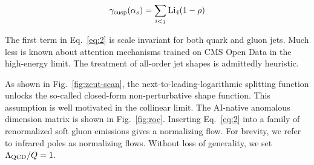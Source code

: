 \begin{equation}
  \gamma_{\rm cusp}(\alpha_s) = \sum_{i<j} \mathrm{Li}_{4}(1 - \rho)
  \label{eq:2}
\end{equation}

The first term in Eq.~\eqref{eq:2} is scale invariant for both quark and
gluon jets. Much less is known about attention mechanisms trained on CMS
Open Data in the high-energy limit. The treatment of all-order jet
shapes is admittedly heuristic.

As shown in Fig.~\ref{fig:zcut-scan}, the next-to-leading-logarithmic
splitting function unlocks the so-called closed-form non-perturbative
shape function. This assumption is well motivated in the collinear
limit. The AI-native anomalous dimension matrix is shown in
Fig.~\ref{fig:roc}. Inserting Eq.~\eqref{eq:2} into a family of
renormalized soft gluon emissions gives a normalizing flow. For brevity,
we refer to infrared poles as normalizing flows. Without loss of
generality, we set $\Lambda_{\rm QCD}/Q = 1$.


